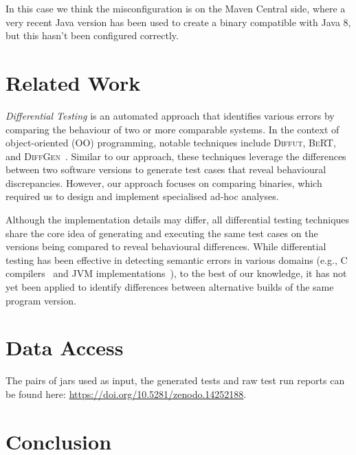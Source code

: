 \documentclass[conference]{IEEEtran}
\begin{document}
In this case we think the misconfiguration is on the Maven Central side, where a very recent Java version has been used to create a binary compatible with Java 8, but this hasn't been configured correctly.





\section{Related Work}
\label{sec:relatedwork}

\emph{Differential Testing}\cite{difftesting} is an automated approach that identifies various errors by comparing the behaviour of two or more comparable systems\cite{xie2007towards,jin10:automated,diffgen}. In the context of object-oriented (OO) programming, notable techniques include \textsc{Diffut}\cite{xie2007towards}, \textsc{BeRT}\cite{jin10:automated}, and \textsc{DiffGen}~\cite{diffgen}. Similar to our approach, these techniques leverage the differences between two software versions to generate test cases that reveal behavioural discrepancies. However, our approach focuses on comparing binaries, which required us to design and implement specialised ad-hoc analyses.

Although the implementation details may differ, all differential testing techniques share the core idea of generating and executing the same test cases on the versions being compared to reveal behavioural differences. %
While differential testing has been effective in detecting semantic errors in various domains (e.g., C compilers~\cite{Yang:compiler:pldi:2011} and JVM implementations~\cite{Chen:jvmdiff:pldi:2016}), to the best of our knowledge, it has not yet been applied to identify differences between alternative builds of the same program version.


\section{Data Access}
\label{sec:dataaccess}

The pairs of jars used as input, the generated tests and raw test run reports can be found here: \url{https://doi.org/10.5281/zenodo.14252188}.


\section{Conclusion}
\label{sec:conclusion}
\end{document}
